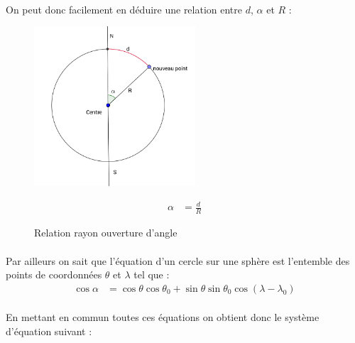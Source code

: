 \documentclass[a4paper]{report}
\begin{document}
\paragraph{} On peut donc facilement en déduire une relation entre $d$, $\alpha$ et $R$ :

\begin{figure}[H]
	\begin{minipage}[c]{.46\linewidth}
		\begin{center}
			\includegraphics[width=6cm]{image/relation_angle_rayon}
       			\caption{Relation rayon ouverture d'angle}
			\label{Relation rayon ouverture d'angle}
		\end{center}
	\end{minipage} \hfill
	\begin{minipage}[c]{.46\linewidth}
		\begin{align}
			\alpha &= \frac{d}{R}
		\end{align}
	\end{minipage}
\end{figure}	

\paragraph{} Par ailleurs on sait que l'équation d'un cercle sur une sphère est l'entemble des points de coordonnées $\theta$ et $\lambda$ tel que \cite{ref_cercle_sphere}:
\begin{align}
	\cos\alpha &= \cos\theta\cos\theta_{0} + \sin\theta\sin\theta_{0}\cos(\lambda - \lambda_{0})
\end{align}

\paragraph{} En mettant en commun toutes ces équations on obtient donc le système d'équation suivant :
\end{document}
